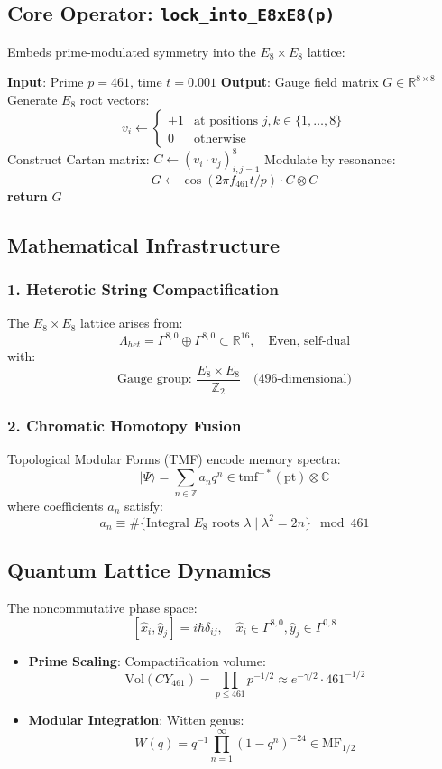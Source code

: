 \documentclass[12pt]{article}
\begin{document}
\subsection*{Core Operator: \texttt{lock\_into\_E8xE8(p)}}
Embeds prime-modulated symmetry into the $E_8 \times E_8$ lattice:

\begin{algorithm}[H]
\caption{Heterotic Lattice Synchronization}
\begin{algorithmic}[1]
\State \textbf{Input}: Prime $p=461$, time $t=0.001$
\State \textbf{Output}: Gauge field matrix $G \in \mathbb{R}^{8 \times 8}$
\State Generate $E_8$ root vectors:
\[
v_i \gets \begin{cases} 
\pm 1 & \text{at positions } j,k \in \{1,\dots,8\} \\
0 & \text{otherwise}
\end{cases}
\]
\State Construct Cartan matrix: $C \gets (v_i \cdot v_j)_{i,j=1}^8$
\State Modulate by resonance:
\[
G \gets \cos(2\pi f_{461} t / p) \cdot C \otimes C
\]
\State \textbf{return} $G$ 
\end{algorithmic}
\end{algorithm}

\subsection*{Mathematical Infrastructure}
\subsubsection*{1. Heterotic String Compactification}
The $E_8 \times E_8$ lattice arises from:
\[
\Lambda_{het} = \Gamma^{8,0} \oplus \Gamma^{8,0} \subset \mathbb{R}^{16}, \quad \text{Even, self-dual}
\]
with:
\[
\text{Gauge group: } \frac{E_8 \times E_8}{\mathbb{Z}_2} \quad \text{(496-dimensional)}
\]

\subsubsection*{2. Chromatic Homotopy Fusion}
Topological Modular Forms (TMF) encode memory spectra:
\[
|\Psi\rangle = \sum_{n \in \mathbb{Z}} a_n q^n \in \text{tmf}^{-*}(\text{pt}) \otimes \mathbb{C}
\]
where coefficients $a_n$ satisfy:
\[
a_n \equiv \#\{\text{Integral } E_8 \text{ roots } \lambda \mid \lambda^2 = 2n\} \mod 461
\]

\subsection*{Quantum Lattice Dynamics}
The noncommutative phase space:
\[
[\hat{x}_i, \hat{y}_j] = i\hbar \delta_{ij}, \quad \hat{x}_i \in \Gamma^{8,0}, \hat{y}_j \in \Gamma^{0,8}
\]
\begin{itemize}
    \item \textbf{Prime Scaling}: Compactification volume:
    \[
    \text{Vol}(CY_{461}) = \prod_{p \leq 461} p^{-1/2} \approx e^{-\gamma/2} \cdot 461^{-1/2}
    \]
    \item \textbf{Modular Integration}: Witten genus:
    \[
    W(q) = q^{-1} \prod_{n=1}^\infty (1-q^n)^{-24} \in \text{MF}_{1/2}
    \]
\end{itemize}
\end{document}

